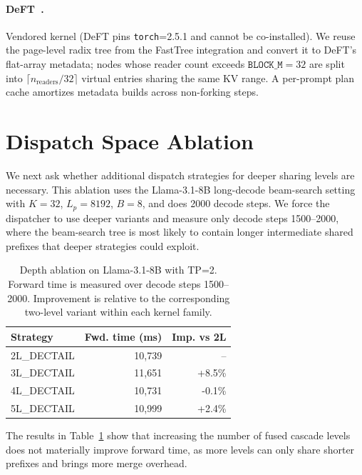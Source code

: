 \documentclass[11pt]{article}
\begin{document}
  \paragraph{DeFT~\cite{yao2025deft}.} Vendored kernel (DeFT pins
  \texttt{torch}=2.5.1 and cannot be co-installed). We reuse the
  page-level radix tree from the FastTree integration and convert it
  to DeFT's flat-array metadata; nodes whose reader count exceeds
  $\mathtt{BLOCK\_M}=32$ are split into
  $\lceil n_{\text{readers}}/32 \rceil$ virtual entries sharing the
  same KV range. A per-prompt plan cache amortizes metadata builds
  across non-forking steps.



\section{Dispatch Space Ablation}

We next ask whether additional dispatch strategies for deeper sharing
levels are necessary. This ablation uses the Llama-3.1-8B long-decode
beam-search setting with $K=32$, $L_p=8192$, $B=8$, and
does 2000 decode steps. We force the dispatcher to use deeper variants and measure only decode steps 1500--2000, where the
beam-search tree is most likely to contain longer intermediate shared
prefixes that deeper strategies could exploit.

\begin{table}[H]
\centering
\caption{
Depth ablation on Llama-3.1-8B with TP=2. Forward time is measured
over decode steps 1500--2000. Improvement is relative to the
corresponding two-level variant within each kernel family.
}
\label{tab:llama8b_depth_ablation}
\begin{tabular}{@{}lrr@{}}
\toprule
Strategy & Fwd. time (ms) & Imp. vs 2L \\
\midrule
  2L\_DECTAIL & 10{,}739 & -- \\                             
  3L\_DECTAIL & 11{,}651 & +8.5\% \\                          
  4L\_DECTAIL & 10{,}731 & -0.1\% \\                          
  5L\_DECTAIL & 10{,}999 & +2.4\% \\                                                 
\bottomrule                       
\end{tabular} 
\end{table}

The results in Table~\ref{tab:llama8b_depth_ablation} show that increasing the number of fused cascade
levels does not materially improve forward time, as more levels can only share shorter prefixes and brings more merge overhead.
\end{document}
